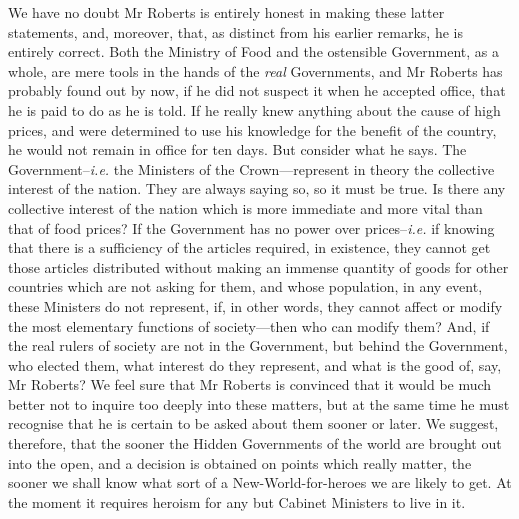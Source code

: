 \documentclass{book}
\begin{document}
We have no doubt Mr Roberts is entirely honest in making these latter statements, and, moreover, that, as distinct from his earlier remarks, he is entirely correct. Both the Ministry of Food and the ostensible Government, as a whole, are mere tools in the hands of the \emph{real} Governments, and Mr Roberts has probably found out by now, if he did not suspect it when he accepted office, that he is paid to do as he is told. If he really knew anything about the cause of high prices, and were determined to use his knowledge for the benefit of the country, he would not remain in office for ten days. But consider what he says. The Government–\emph{i.e.} the Ministers of the Crown—represent in theory the collective interest of the nation. They are always saying so, so it must be true. Is there any collective interest of the nation which is more immediate and more vital than that of food prices? If the Government has no power over prices–\emph{i.e.} if knowing that there is a sufficiency of the articles required, in existence, they cannot get those articles distributed without making an immense quantity of goods for other countries which are not asking for them, and whose population, in any event, these Ministers do not represent, if, in other words, they cannot affect or modify the most elementary functions of society—then who can modify them? And, if the real rulers of society are not in the Government, but behind the Government, who elected them, what interest do they represent, and what is the good of, say, Mr Roberts? We feel sure that Mr Roberts is convinced that it would be much better not to inquire too deeply into these matters, but at the same time he must recognise that he is certain to be asked about them sooner or later. We suggest, therefore, that the sooner the Hidden Governments of the world are brought out into the open, and a decision is obtained on points which really matter, the sooner we shall know what sort of a New-World-for-heroes we are likely to get. At the moment it requires heroism for any but Cabinet Ministers to live in it.
\end{document}
